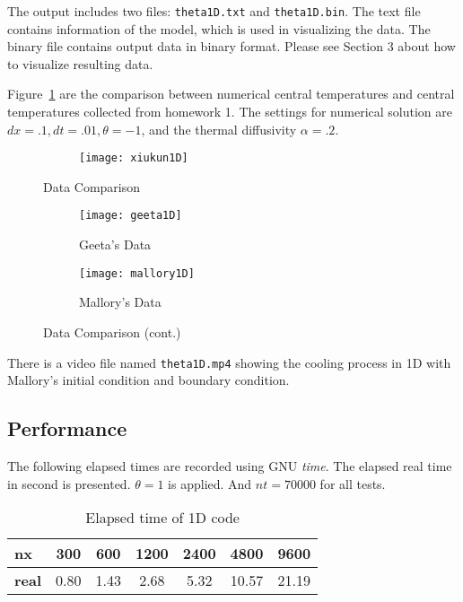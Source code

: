 \documentclass[letterpaper,12pt,fleqn]{article}
\begin{document}
The output includes two files: \texttt{theta1D.txt} and \texttt{theta1D.bin}.
The text file contains information of the model, which is used in visualizing the data.
The binary file contains output data in binary format.
Please see Section 3 about how to visualize resulting data.

Figure~\ref{fig:data-comp-1d} are the comparison between numerical central temperatures and central temperatures collected from homework 1.
The settings for numerical solution are $dx=.1, dt=.01, \theta=-1$, and the thermal diffusivity $\alpha=.2$.

\begin{figure}[H]
  \begin{subfigure}[b]{\textwidth}
    \centering
    \texttt{[image: xiukun1D]}
  \end{subfigure}
  \caption{Data Comparison}
\end{figure}
\begin{figure}[H]\ContinuedFloat
  \begin{subfigure}[b]{\textwidth}
    \centering
    \texttt{[image: geeta1D]}
    \caption{Geeta's Data}
  \end{subfigure}

  \begin{subfigure}[b]{\textwidth}
    \centering
    \texttt{[image: mallory1D]}
    \caption{Mallory's Data}
  \end{subfigure}
  \caption{Data Comparison (cont.)}
  \label{fig:data-comp-1d}
\end{figure}
There is a video file named \texttt{theta1D.mp4} showing the cooling process in 1D with Mallory's initial condition and boundary condition.


\subsection{Performance}
The following elapsed times are recorded using GNU \textit{time}. 
The elapsed real time in second is presented.
$\theta=1$ is applied. And $nt=70000$ for all tests.

\begin{table}[H]
  \centering
  \begin{tabular}{l c c c c c c}
    \toprule
    \textbf{nx} & 300 & 600 & 1200 & 2400 & 4800 & 9600\\
    \midrule
    \textbf{real} & 0.80 & 1.43 & 2.68 & 5.32 & 10.57 & 21.19\\
    \bottomrule
  \end{tabular}
  \caption{Elapsed time of 1D code}
  \label{tab:time-1d}
\end{table}
\end{document}
